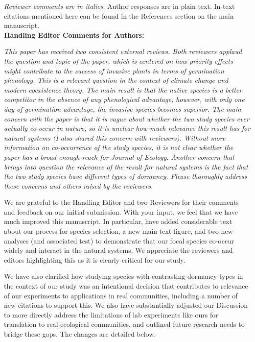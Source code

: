 \documentclass[11pt]{article}
\begin{document}
\emph{Reviewer comments are in italics.} Author responses are in plain text. In-text citations mentioned here can be found in the References section on the main manuscript.\\

\textbf{Handling Editor Comments for Authors:}

\emph{This paper has received two consistent external reviews. Both reviewers applaud the question and topic of the paper, which is centered on how priority effects might contribute to the success of invasive plants in terms of germination phenology. This is a relevant question in the context of climate change and modern coexistence theory. The main result is that the native species is a better competitor in the absence of any phenological advantage; however, with only one day of germination advantage, the invasive species becomes superior. The main concern with the paper is that it is vague about whether the two study species ever actually co-occur in nature, so it is unclear how much relevance this result has for natural systems (I also shared this concern with reviewers). Without more information on co-occurrence of the study species, it is not clear whether the paper has a broad enough reach for Journal of Ecology. Another concern that brings into question the relevance of the result for natural systems is the fact that the two study species have different types of dormancy. Please thoroughly address these concerns and others raised by the reviewers. }

We are grateful to the Handling Editor and two Reviewers for their comments and feedback on our initial submission. With your input, we feel that we have much improved this manuscript. In particular, have added considerable text about our process for species selection, a new main text figure, and two new analyses (and associated test) to demonstrate that our focal species co-occur widely and interact in the natural systems. We appreciate the reviewers and editors highlighting this as it is clearly critical for our study. %

We have also clarified how studying species with contrasting dormancy types in the context of our study was an intentional decision that contributes to relevance of our experiments to applications in real communities, including a number of new citations to support this. We also have substantially adjusted our Discussion to more directly address the limitations of lab experiments like ours for translation to real ecological communities, and outlined future research needs to bridge these gaps. The changes are detailed below.
\end{document}

